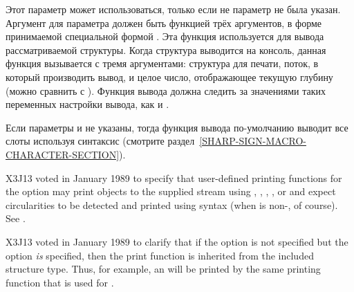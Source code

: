 \begin{flushdesc}
\item[\cd{:print-function}] Этот параметр может использоваться, только если не
  параметр  не была указан.  Аргумент для параметра
   должен быть функцией трёх аргументов, в форме принимаемой
  специальной формой . Эта функция используется для вывода
  рассматриваемой структуры.  Когда структура выводится на консоль, данная
  функция вызывается с тремя аргументами: структура для печати, поток, в который
  производить вывод, и целое число, отображающее текущую глубину (можно сравнить
  с ).  Функция вывода должна следить за значениями таких
  переменных настройки вывода, как  и .

  Если параметры  и  не указаны, тогда функция
  вывода по-умолчанию выводит все слоты используя синтаксис  (смотрите
  раздел~\ref{SHARP-SIGN-MACRO-CHARACTER-SECTION}).

\begin{new}
  X3J13 voted in January 1989  to specify that
  user-defined printing functions for the  
  option may print objects to the supplied stream using ,
  , , , or  and expect
  circularities to be detected and printed using  syntax
  (when  is non-, of course).  See
  .
\end{new}


\begin{new}
  X3J13 voted in January 1989  to
  clarify that if the  option is not specified but the
   option \emph{is} specified, then the print function is inherited
  from the included structure type.  Thus, for example, an  will
  be printed by the same printing function that is used for .


\end{new}
\end{flushdesc}
